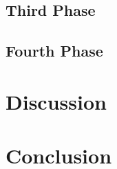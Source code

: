 \documentclass[twoside,11pt]{article}
\begin{document}

\subsection{Third Phase} %


\subsection{Fourth Phase} %








\section{Discussion} %
\label{sec:dis}


\section{Conclusion} %
\label{sec:con}



\end{document}
